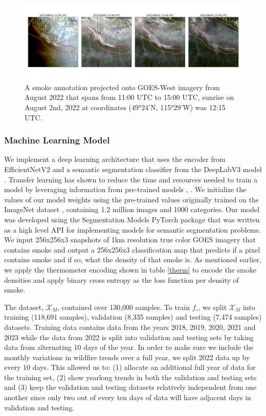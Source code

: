 \documentclass{article}
\begin{document}
\begin{figure}
    \centering
    \includegraphics[width=12cm]{figures/timelapse_G17_2.png}
    \caption{A smoke annotation projected onto GOES-West imagery from August 2022 that spans from 11:00 UTC to 15:00 UTC, sunrise on August 2nd, 2022 at coordinates (49°24'N, 115°29'W) was 12:15 UTC.}\label{G17_sunrise}
\end{figure}

\subsubsection*{Machine Learning Model} 

We implement a deep learning architecture that uses the encoder from EfficientNetV2 \cite{efficientnetv2} and a semantic segmentation classifier from the DeepLabV3 model \cite{deeplab}. Transfer learning has shown to reduce the time and resources needed to train a model by leveraging information from pre-trained models \cite{transfer}, \cite{transfer2}. We initialize the values of our model weights using the pre-trained values originally trained on the ImageNet dataset \cite{imgnet}, containing 1.2 million images and 1000 categories. Our model was developed using the Segmentation Models PyTorch package \cite{semantic} that was written as a high level API for implementing models for semantic segmentation problems. We input 256x256x3 snapshots of 1km resolution true color GOES imagery that contains smoke and output a 256x256x3 classification map that predicts if a pixel contains smoke and if so, what the density of that smoke is. As mentioned earlier, we apply the thermometer encoding shown in table \ref{therm} to encode the smoke densities and apply binary cross entropy as the loss function per density of smoke. 


The dataset, \(\mathcal{X}_M\), contained over 130,000 samples. To train \(f_{\circ}\), we split \(\mathcal{X}_M\) into training (118,691 samples), validation (8,335 samples) and testing (7,474 samples) datasets. Training data contains data from the years 2018, 2019, 2020, 2021 and 2023 while the data from 2022 is split into validation and testing sets by taking data from alternating 10 days of the year. In order to make sure we include the monthly variations in wildfire trends over a full year, we split 2022 data up by every 10 days. This allowed us to: (1) allocate an additional full year of data for the training set, (2) show yearlong trends in both the validation and testing sets and (3) keep the validation and testing datasets relatively independent from one another since only two out of every ten days of data will have adjacent days in validation and testing.
\end{document}
